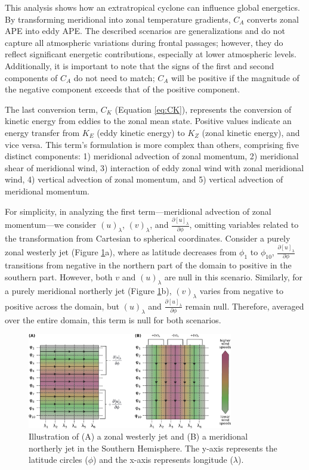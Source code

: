 This analysis shows how an extratropical cyclone can influence global energetics. By transforming meridional into zonal temperature gradients, $C_A$ converts zonal APE into eddy APE. The described scenarios are generalizations and do not capture all atmospheric variations during frontal passages; however, they do reflect significant energetic contributions, especially at lower atmospheric levels. Additionally, it is important to note that the signs of the first and second components of $C_A$ do not need to match; $C_A$ will be positive if the magnitude of the negative component exceeds that of the positive component.


The last conversion term, $C_K$ (Equation \ref{eq:CK}), represents the conversion of kinetic energy from eddies to the zonal mean state. Positive values indicate an energy transfer from $K_E$ (eddy kinetic energy) to $K_Z$ (zonal kinetic energy), and vice versa. This term's formulation is more complex than others, comprising five distinct components: 1) meridional advection of zonal momentum, 2) meridional shear of meridional wind, 3) interaction of eddy zonal wind with zonal meridional wind, 4) vertical advection of zonal momentum, and 5) vertical advection of meridional momentum.

For simplicity, in analyzing the first term—meridional advection of zonal momentum—we consider \( (u)_\lambda \), \( (v)_\lambda \), and \( \frac{\partial [u]_\lambda}{\partial \phi} \), omitting variables related to the transformation from Cartesian to spherical coordinates. Consider a purely zonal westerly jet (Figure \ref{fig:Ck_1}a), where as latitude decreases from \( \phi_1 \) to \( \phi_{10} \), \( \frac{\partial [u]_\lambda}{\partial \phi} \) transitions from negative in the northern part of the domain to positive in the southern part. However, both \( v \) and \( (u)_\lambda \) are null in this scenario. Similarly, for a purely meridional northerly jet (Figure \ref{fig:Ck_1}b), \( (v)_\lambda \) varies from negative to positive across the domain, but \( (u)_\lambda \) and \( \frac{\partial [u]_\lambda}{\partial \phi} \) remain null. Therefore, averaged over the entire domain, this term is null for both scenarios.

\begin{figure}[h]
\begin{center}
\includegraphics[width=0.8\textwidth]{fig/Ck_1.pdf}
\caption[Zonal and meridional jets]{Illustration of (A) a zonal westerly jet and (B) a meridional northerly jet in the Southern Hemisphere. The y-axis represents the latitude circles (\(\phi\)) and the x-axis represents longitude (\(\lambda\)).}
\label{fig:Ck_1}
\end{center}
\end{figure}

